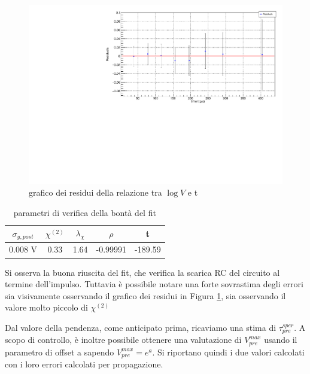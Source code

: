 \documentclass{article}
\begin{document}
\begin{center}
\begin{figure}[H]
\centering
\includegraphics[scale=0.4, angle=0]{preampRCresidui.pdf}
\caption{grafico dei residui della relazione tra $\log V$ e t}
\label{fig:QinvsVshRESIDUI}
\end{figure}
\end{center}

\begin{table}[ht]
    \centering
    \begin{tabular}{ccccc}
        \toprule
        $\sigma_{y, post}$    &$\chi^{(2)}$    &$\lambda_{\chi}$   &$\rho$  &t   \\
        \midrule
        0.008 V               &0.33            &1.64              &-0.99991&-189.59\\
        \bottomrule
    \end{tabular}
    \caption{parametri di verifica della bontà del fit}
\end{table}

Si osserva la buona riuscita del fit, che verifica la scarica RC del circuito al termine dell'impulso.
Tuttavia è possibile notare una forte sovrastima degli errori sia visivamente osservando il grafico dei
residui in Figura \ref{fig:QinvsVshRESIDUI}, sia osservando il valore molto piccolo di $\chi^{(2)}$

Dal valore della pendenza, come anticipato prima, ricaviamo una stima di $\tau_{pre}^{sper}$. A scopo di controllo, è inoltre possibile 
ottenere una valutazione di $V_{pre}^{max}$ usando il parametro di offset a sapendo $V_{pre}^{max} = e^a$. Si riportano quindi i due
valori calcolati con i loro errori calcolati per propagazione.
\end{document}
